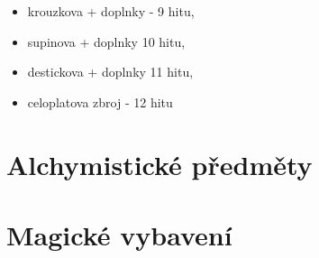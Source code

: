\begin{Predmet}
\begin{itemize}
	\item krouzkova + doplnky - 9 hitu,
	\item supinova + doplnky 10 hitu, 
	\item destickova + doplnky 11 hitu, 
\end{itemize}
\end{Predmet}

\begin{Predmet}
\begin{itemize}
	\item celoplatova zbroj - 12 hitu
\end{itemize}
\end{Predmet}

\section{Alchymistické předměty}
\label{sec:alchymisticke-predmety}

\section{Magické vybavení}
\label{sec:magicke-vybaveni}





